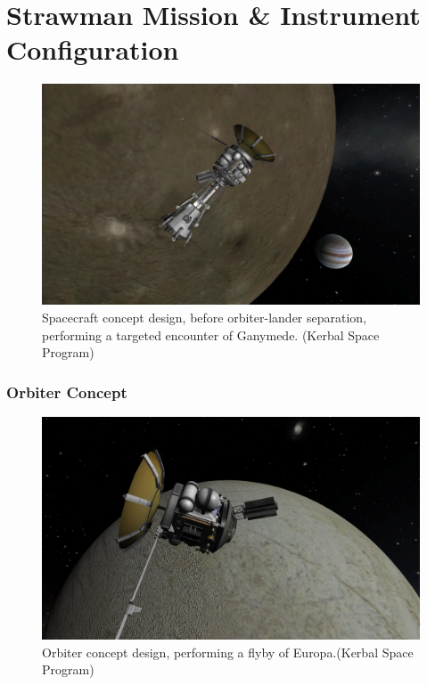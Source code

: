 \chapter{Strawman Mission \& Instrument Configuration}
\begin{figure}[htb!]
\centering
\includegraphics[width=\textwidth]{figures/Orbiter/9.PNG}
\caption{Spacecraft concept design, before orbiter-lander separation, performing a targeted encounter of Ganymede. (Kerbal Space Program)}
\label{fig:spacecraft}
\end{figure}

\newpage 
\subsection{Orbiter Concept}

\begin{figure}[htb!]
\centering
\includegraphics[width=\textwidth]{figures/Orbiter/orbiter.PNG}
\caption{Orbiter concept design, performing a flyby of Europa.(Kerbal Space Program)}
\label{fig:orbiter}
\end{figure}

